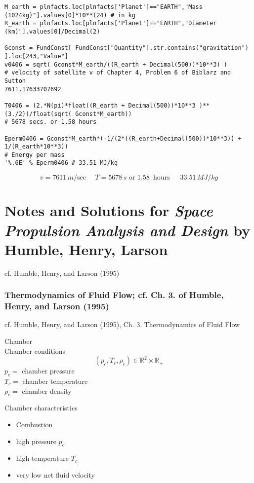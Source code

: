 \documentclass[10pt]{amsart}
\begin{document}
\begin{multicols*}{2}
\begin{lstlisting}
M_earth = plnfacts.loc[plnfacts['Planet']=="EARTH","Mass (1024kg)"].values[0]*10**(24) # in kg
R_earth = plnfacts.loc[plnfacts['Planet']=="EARTH","Diameter (km)"].values[0]/Decimal(2)

Gconst = FundConst[ FundConst["Quantity"].str.contains("gravitation") ].loc[243,"Value"]
v0406 = sqrt( Gconst*M_earth/((R_earth + Decimal(500))*10**3) )  
# velocity of satellite v of Chapter 4, Problem 6 of Biblarz and Sutton
7611.17633707692

T0406 = (2.*N(pi)*float((R_earth + Decimal(500))*10**3 )**(3./2))/float(sqrt( Gconst*M_earth)) 
# 5678 secs. or 1.58 hours

Eperm0406 = Gconst*M_earth*(-1/(2*((R_earth+Decimal(500))*10**3)) + 1/(R_earth*10**3)) 
# Energy per mass
'%.6E' % Eperm0406 # 33.51 MJ/kg
\end{lstlisting}  
\[
v = \boxed{ 7611 \, m/\text{sec} \, \quad \, T = 5678 \, s \text{ or } 1.58 \, \text{ hours }  \quad \, 33.51 \, MJ/kg }
\]

\part{Notes and Solutions for \emph{Space Propulsion Analysis and Design} by Humble, Henry, Larson}

cf. Humble, Henry, and Larson (1995) \cite{HHL1995}




\section{Thermodynamics of Fluid Flow; cf. Ch. 3. of Humble, Henry, and Larson (1995) \cite{HHL1995}}




cf. Humble, Henry, and Larson (1995), Ch. 3. Thermodynamics of Fluid Flow \cite{HHL1995} 


Chamber \\
Chamber conditions 
\[
(p_c, T_c, \rho_c) \in \mathbb{R}^2 \times \mathbb{R}_+
\]
$p_c = $ chamber pressure \\
$T_c = $ chamber temperature \\
$\rho_c = $ chamber density

Chamber characteristics \\
\begin{itemize} 
\item Combustion
\item high pressure $p_c$ 
\item high temperature $T_c$ 
\item very low net fluid velocity 
\end{itemize}


\end{multicols*}
\end{document}
